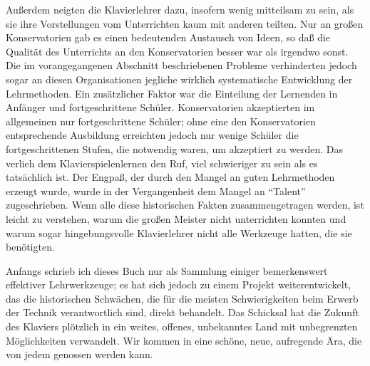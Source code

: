 Außerdem neigten die Klavierlehrer dazu, insofern wenig mitteilsam zu sein, als sie ihre Vorstellungen vom Unterrichten kaum mit anderen teilten.
Nur an großen Konservatorien gab es einen bedeutenden Austausch von Ideen, so daß die Qualität des Unterrichts an den Konservatorien besser war als irgendwo sonst.
Die im vorangegangenen Abschnitt beschriebenen Probleme verhinderten jedoch sogar an diesen Organisationen jegliche wirklich systematische Entwicklung der Lehrmethoden.
Ein zusätzlicher Faktor war die Einteilung der Lernenden in Anfänger und fortgeschrittene Schüler.
Konservatorien akzeptierten im allgemeinen nur fortgeschrittene Schüler; ohne eine den Konservatorien entsprechende Ausbildung erreichten jedoch nur wenige Schüler die fortgeschrittenen Stufen, die notwendig waren, um akzeptiert zu werden.
Das verlieh dem Klavierspielenlernen den Ruf, viel schwieriger zu sein als es tatsächlich ist.
Der Engpaß, der durch den Mangel an guten Lehrmethoden erzeugt wurde, wurde in der Vergangenheit dem Mangel an \enquote{Talent} zugeschrieben.
Wenn alle diese historischen Fakten zusammengetragen werden, ist leicht zu verstehen, warum die großen Meister nicht unterrichten konnten und warum sogar hingebungsvolle Klavierlehrer nicht alle Werkzeuge hatten, die sie benötigten.

Anfangs schrieb ich dieses Buch nur als Sammlung einiger bemerkenswert effektiver Lehrwerkzeuge; es hat sich jedoch zu einem Projekt weiterentwickelt, das die historischen Schwächen, die für die meisten Schwierigkeiten beim Erwerb der Technik verantwortlich sind, direkt behandelt.
Das Schicksal hat die Zukunft des Klaviers plötzlich in ein weites, offenes, unbekanntes Land mit unbegrenzten Möglichkeiten verwandelt.
Wir kommen in eine schöne, neue, aufregende Ära, die von jedem genossen werden kann.



